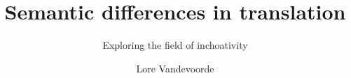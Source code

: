 \title{Semantic differences in translation}
\subtitle{Exploring the field of inchoativity} 
\dedication{
On ne voit bien qu’avec le cœur\\
L’essentiel est invisible pour les yeux\\
(Antoine de Saint-Exupéry)
} 
\author{Lore Vandevoorde}
\renewcommand{\lsISBNdigital}{978-3-96110-072-9}
\renewcommand{\lsISBNhardcover}{978-3-96110-073-6}
\renewcommand{\lsSeries}{tmnlp}
\renewcommand{\lsSeriesNumber}{} %